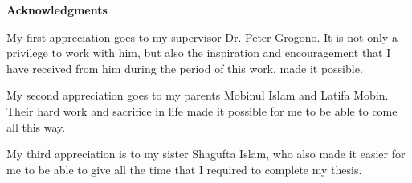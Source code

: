 \newpage
{}
\label{acknowledgments}
\begin{center}
\Large \textbf{Acknowledgments}\\[0.5cm]
\end{center}

My first appreciation goes to my supervisor Dr. Peter Grogono. It is not only a privilege to work with him, but also the inspiration and encouragement that I have received from him during the period of this work, made it possible.

My second appreciation goes to my parents Mobinul Islam and Latifa Mobin. Their hard work and sacrifice in life made it possible for me to be able to come all this way.

My third appreciation is to my sister Shagufta Islam, who also made it easier for me to be able to give all the time that I required to complete my thesis.